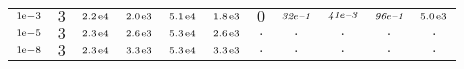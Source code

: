 \begin{tiny}
\begin{tabular}{@{$\;$}c@{$\;$}|@{$\;$}c@{$\;$}@{$\;$}c@{$\;$}@{$\;$}c@{$\;$}@{$\;$}c@{$\;$}@{$\;$}c@{$\;$}|@{$\;$}c@{$\;$}@{$\;$}c@{$\;$}@{$\;$}c@{$\;$}@{$\;$}c@{$\;$}@{$\;$}c@{$\;$}}
$\scriptstyle1\!\mathrm{\hspace{0.10em}e}-3$ & $\scriptstyle3$ & $\scriptstyle2.2\mathrm{\hspace{0.10em}e}4$ & $\scriptstyle2.0\mathrm{\hspace{0.10em}e}3$ & $\scriptstyle5.1\mathrm{\hspace{0.10em}e}4$ & $\scriptstyle1.8\mathrm{\hspace{0.10em}e}3$ & $\scriptstyle0$ & $\scriptstyle\textit{32}\hspace{0.00em}e\textit{--1}$ & $\scriptstyle\textit{41}\hspace{0.00em}e\textit{--3}$ & $\scriptstyle\textit{96}\hspace{0.00em}e\textit{--1}$ & $\scriptstyle5.0\mathrm{\hspace{0.10em}e}3$\\ 
$\scriptstyle1\!\mathrm{\hspace{0.10em}e}-5$ & $\scriptstyle3$ & $\scriptstyle2.3\mathrm{\hspace{0.10em}e}4$ & $\scriptstyle2.6\mathrm{\hspace{0.10em}e}3$ & $\scriptstyle5.3\mathrm{\hspace{0.10em}e}4$ & $\scriptstyle2.6\mathrm{\hspace{0.10em}e}3$ & $\scriptstyle.$ & $\scriptstyle.$ & $\scriptstyle.$ & $\scriptstyle.$ & $\scriptstyle.$\\ 
$\scriptstyle1\!\mathrm{\hspace{0.10em}e}-8$ & $\scriptstyle3$ & $\scriptstyle2.3\mathrm{\hspace{0.10em}e}4$ & $\scriptstyle3.3\mathrm{\hspace{0.10em}e}3$ & $\scriptstyle5.3\mathrm{\hspace{0.10em}e}4$ & $\scriptstyle3.3\mathrm{\hspace{0.10em}e}3$ & $\scriptstyle.$ & $\scriptstyle.$ & $\scriptstyle.$ & $\scriptstyle.$ & $\scriptstyle.$\\ 
\end{tabular} 
\end{tiny} 
